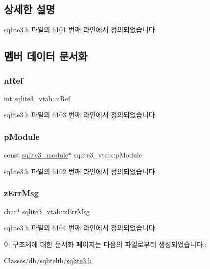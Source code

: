 \subsection{상세한 설명}


sqlite3.\+h 파일의 6101 번째 라인에서 정의되었습니다.



\subsection{멤버 데이터 문서화}
\mbox{\label{structsqlite3__vtab_ab3c80d385849bdd82363a0df7d6fcba8}} 
\subsubsection{\texorpdfstring{n\+Ref}{nRef}}
{\footnotesize\ttfamily int sqlite3\+\_\+vtab\+::n\+Ref}



sqlite3.\+h 파일의 6103 번째 라인에서 정의되었습니다.

\mbox{\label{structsqlite3__vtab_a4ef8198ca611b73a9b23054dd1e91e2b}} 
\subsubsection{\texorpdfstring{p\+Module}{pModule}}
{\footnotesize\ttfamily const \hyperlink{structsqlite3__module}{sqlite3\+\_\+module}$\ast$ sqlite3\+\_\+vtab\+::p\+Module}



sqlite3.\+h 파일의 6102 번째 라인에서 정의되었습니다.

\mbox{\label{structsqlite3__vtab_afc50eadfdd7cef876633d460deba48d6}} 
\subsubsection{\texorpdfstring{z\+Err\+Msg}{zErrMsg}}
{\footnotesize\ttfamily char$\ast$ sqlite3\+\_\+vtab\+::z\+Err\+Msg}



sqlite3.\+h 파일의 6104 번째 라인에서 정의되었습니다.



이 구조체에 대한 문서화 페이지는 다음의 파일로부터 생성되었습니다.\+:\begin{DoxyCompactItemize}
\item 
Classes/db/sqlitelib/\hyperlink{sqlite3_8h}{sqlite3.\+h}\end{DoxyCompactItemize}

